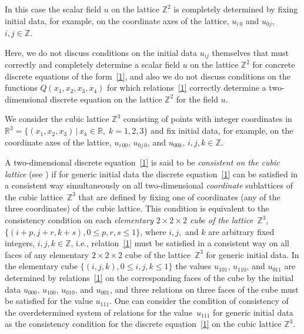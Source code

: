 \documentclass[11pt]{article}
\begin{document}
In this case the scalar f\/ield $u$ on the lattice $\mathbb{Z}^2$ is
completely determined by f\/ixing initial data, for example, on the
coordinate axes of the lattice, $u_{i \, 0}$ and $u_{ 0 j}$, $i, j
\in \mathbb{Z}$.







Here, we do not discuss conditions on the initial data $u_{i j}$
themselves that must correctly and completely determine a scalar
f\/ield $u$ on the lattice $\mathbb{Z}^2$ for concrete discrete
equations of the form~\eqref{1}, and also we do not discuss
conditions on the functions $Q (x_1, x_2, x_3, x_4)$ for which
relations~\eqref{1} correctly determine a two-dimensional discrete
equation on the lattice $\mathbb{Z}^2$ for the f\/ield $u$.






We consider the cubic lattice $\mathbb{Z}^3$ consisting of points
with integer coordinates in $\mathbb{R}^3 = \{ (x_1, x_2, x_3)\,|\, x_k
\in \mathbb{R},\;  k =1, 2, 3 \}$ and f\/ix initial data, for example,
on the coordinate axes of the lattice, $u_{i\, 0 0}$, $u_{ 0 j\,
0}$, and $u_{ 0 0 k}$, $i, j, k \in \mathbb{Z}$.





A two-dimensional discrete equation~\eqref{1} is said to be {\it
consistent on the cubic lattice} (see \cite{3, 4, 5, 6, 7}) if for generic
initial data the discrete equation~\eqref{1} can be satisf\/ied in a
consistent way simultaneously on all two-dimensional {\it
coordinate} sublattices of the cubic lattice~$\mathbb{Z}^3$ that are
def\/ined by f\/ixing one of coordinates (any of the three coordinates)
of the cubic lattice. This condition is equivalent to the
consistency condition on each {\it elementary $2 \times 2 \times 2$
cube of the lattice~$\mathbb{Z}^3$}, $\{(i + p, j + r, k + s),  0
\leq p, r, s \leq 1\}$, where $i, j,$ and $k$ are arbitrary f\/ixed
integers, $i, j, k \in \mathbb{Z}$, i.e., relation~\eqref{1} must be
satisf\/ied in a consistent way on all faces of any elementary $2
\times 2 \times 2$ cube of the lattice~$\mathbb{Z}^3$ for generic
initial data. In the elementary cube $\{(i, j, k), 0 \leq i, j, k
\leq 1 \}$ the values $u_{1 0 1}$, $u_{1 1 0}$, and $u_{0 1 1}$ are
determined by relations~\eqref{1} on the corresponding faces of the
cube by the initial data $u_{0 0 0}$, $u_{1 0 0}$, $u_{0 1 0}$, and
$u_{0 0 1}$, and three relations on three faces of the cube must be
satisf\/ied for the value $u_{1 1 1}$. One can consider the condition
of consistency of the overdetermined system of relations for the
value~$u_{1 1 1}$ for generic initial data as the consistency
condition for the discrete equation~\eqref{1} on the cubic lattice
$\mathbb{Z}^3$.
\end{document}
